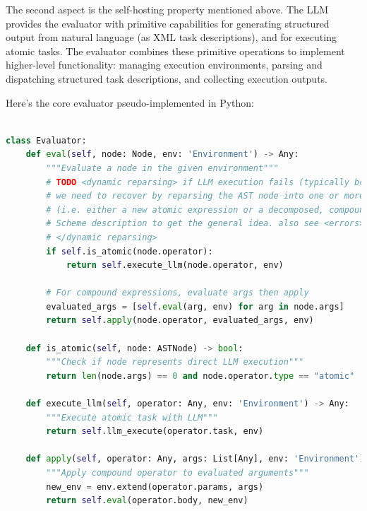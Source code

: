 \documentclass{article}
\begin{document}
The second aspect is the self-hosting property mentioned above. The LLM provides the evaluator with primitive capabilities for generating structured output from natural language (as XML task descriptions), and for executing atomic tasks. The evaluator combines these primitive operations to implement higher-level functionality: managing execution environments, parsing and dispatching structured task descriptions, and collecting execution outputs. 

Here's the core evaluator pseudo-implemented in Python:



\begin{lstlisting}[language=Python]

class Evaluator:
    def eval(self, node: Node, env: 'Environment') -> Any:
        """Evaluate a node in the given environment"""
        # TODO <dynamic reparsing> if LLM execution fails (typically bc of resource exhaustion or verification failure)
        # we need to recover by reparsing the AST node into one or more rewritten subtrees 
        # (i.e. either a new atomic expression or a decomposed, compound expression). See the 
        # Scheme description to get the general idea. also see <errors>
        # </dynamic reparsing>
        if self.is_atomic(node.operator):
            return self.execute_llm(node.operator, env)
            
        # For compound expressions, evaluate args then apply
        evaluated_args = [self.eval(arg, env) for arg in node.args]
        return self.apply(node.operator, evaluated_args, env)
    
    def is_atomic(self, node: ASTNode) -> bool:
        """Check if node represents direct LLM execution"""
        return len(node.args) == 0 and node.operator.type == "atomic"
    
    def execute_llm(self, operator: Any, env: 'Environment') -> Any:
        """Execute atomic task with LLM"""
        return self.llm_execute(operator.task, env)
    
    def apply(self, operator: Any, args: List[Any], env: 'Environment') -> Any:
        """Apply compound operator to evaluated arguments"""
        new_env = env.extend(operator.params, args)
        return self.eval(operator.body, new_env)
\end{lstlisting}
\end{document}
